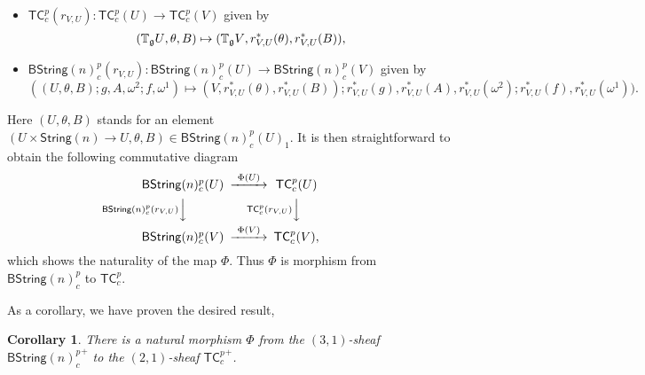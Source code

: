 \documentclass[letterpaper,10pt, oneside]{article} %
\newtheorem{cor}[thm]{Corollary}
\newcommand{\tcalgdp}{{\mathsf{TC}^{p}_{c}}} %
\newcommand{\bstringnp}{\mathsf{BString}(n)^p_{c}} %
\newcommand{\String}{\mathsf{String}}%
\newcommand{\tagu}{{\mathbb{T}_\g U}}
\newcommand{\tagv}{{\mathbb{T}_\g V}}
\def\qed{\hfill ~\vrule height6pt width6pt depth0pt}
\begin{document}
\begin{itemize}
\item $\tcalgdp(r_{V,U}):\tcalgdp(U)\rightarrow \tcalgdp(V)$ given by
\[(\tagu,\theta, B)\mapsto (\tagv, r_{V,U}^*(\theta), r_{V,U}^*(B)), \]
\item $\bstringnp(r_{V,U}):\bstringnp(U)\rightarrow \bstringnp(V)$  given by
\[((U, \theta, B);
g, A, \omega^2; f, \omega^1)\mapsto (V, r_{V,U}^*(\theta), r_{V,U}^*(B));
r_{V,U}^*(g), r_{V,U}^*(A), r_{V,U}^*(\omega^2); r_{V,U}^*(f), r_{V,U}^*(\omega^1))
.\]
\end{itemize}

Here $(U, \theta, B)$ stands for an element $(U\times \String(n)\to U,\theta,B)\in \bstringnp(U)_1.$
It is then straightforward to obtain the following commutative diagram
$$
\begin{CD}
\bstringnp(U) @> \Phi(U) >> \tcalgdp(U) \\
@V \bstringnp(r_{V,U}) VV @V \tcalgdp(r_{V,U}) VV \\
\bstringnp(V) @> \Phi(V) >> \tcalgdp(V),
\end{CD}
$$
which shows the naturality of the map $\Phi$. Thus $\Phi$ is morphism from $\bstringnp$ to $\tcalgdp$.
\qed
\vspace{3mm}

As a corollary, we have proven the desired result,

\begin{cor}\label{Functor}
There is a natural morphism $\Phi$ from the $(3,1)$-sheaf
${\bstringnp}^+$ to the $(2,1)$-sheaf ${\tcalgdp}^+$.
\end{cor}
\end{document}

